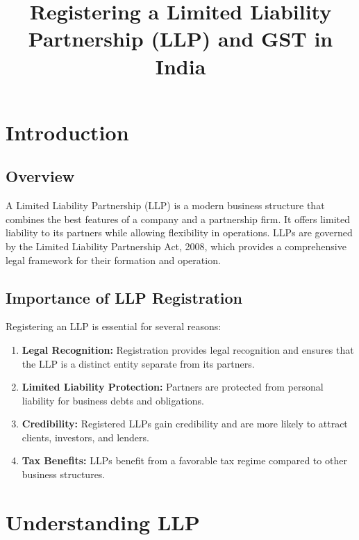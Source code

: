 \documentclass[a4paper,12pt]{report}
\title{Registering a Limited Liability Partnership (LLP) and GST in India}
\author{}
\date{}
\begin{document}
\maketitle

\tableofcontents

\chapter{Introduction}
\section{Overview}
A Limited Liability Partnership (LLP) is a modern business structure that combines the best features of a company and a partnership firm. It offers limited liability to its partners while allowing flexibility in operations. LLPs are governed by the Limited Liability Partnership Act, 2008, which provides a comprehensive legal framework for their formation and operation.

\section{Importance of LLP Registration}
Registering an LLP is essential for several reasons:
\begin{enumerate}
    \item \textbf{Legal Recognition:} Registration provides legal recognition and ensures that the LLP is a distinct entity separate from its partners.
    \item \textbf{Limited Liability Protection:} Partners are protected from personal liability for business debts and obligations.
    \item \textbf{Credibility:} Registered LLPs gain credibility and are more likely to attract clients, investors, and lenders.
    \item \textbf{Tax Benefits:} LLPs benefit from a favorable tax regime compared to other business structures.
\end{enumerate}

\chapter{Understanding LLP}
\end{document}
